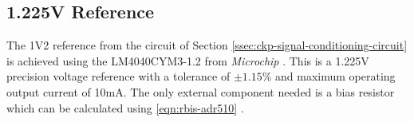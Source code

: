 	\subsection{1.225V  Reference}\label{sssec:1v2-reference}

			The 1V2 reference from the circuit of Section \ref{ssec:ckp-signal-conditioning-circuit} is achieved using the LM4040CYM3-1.2 from \textit{Microchip} \cite{lm4040-datasheet}. This is a 1.225V precision voltage reference with a tolerance of $\pm 1.15\%$ and maximum operating output current of 10mA. The only external component needed is a bias resistor which can be calculated using \ref{eqn:rbis-adr510} \cite{lm4040-datasheet}.

